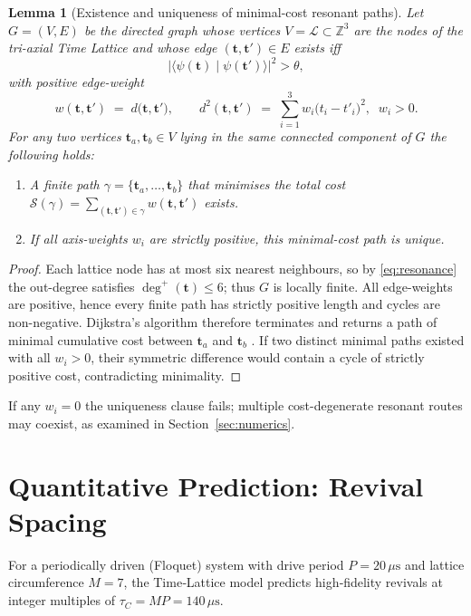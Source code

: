 \documentclass[11pt]{article}
\newtheorem{lemma}{Lemma}
\begin{document}
\begin{lemma}[Existence and uniqueness of minimal-cost resonant paths]\label{lem:minpath}
Let \(G=(V,E)\) be the directed graph whose vertices
\(V=\mathcal L\subset\mathbb Z^{3}\) are the nodes of the tri-axial Time Lattice and
whose edge \((\mathbf t,\mathbf t')\in E\) exists \emph{iff}
\begin{equation}
  \bigl|\langle\psi(\mathbf t)\mid\psi(\mathbf t')\rangle\bigr|^{2}>\theta,
  \label{eq:resonance}
\end{equation}
with positive edge-weight
\[
  w(\mathbf t,\mathbf t') \;=\; d\!\bigl(\mathbf t,\mathbf t'\bigr), 
  \qquad
  d^{2}(\mathbf t,\mathbf t')
  \;=\;
  \sum_{i=1}^{3} w_{i}\bigl(t_{i}-t'_{i}\bigr)^{2},
  \;\; w_{i}>0.
\]
For any two vertices \(\mathbf t_{a},\mathbf t_{b}\in V\) lying in the same
connected component of \(G\) the following holds:
\begin{enumerate}
  \item[(i)] A finite path \(\gamma=\{\mathbf t_{a},\dots,\mathbf t_{b}\}\) that
        minimises the total cost
        \(\mathcal S(\gamma)=\sum_{(\mathbf t,\mathbf t')\in\gamma}
        w(\mathbf t,\mathbf t')\) exists.
  \item[(ii)] If all axis-weights \(w_{i}\) are strictly positive, this
        minimal-cost path is unique.
\end{enumerate}
\end{lemma}

\begin{proof}
Each lattice node has at most six nearest neighbours, so by
\eqref{eq:resonance} the out-degree satisfies \(\deg^{+}(\mathbf t)\le 6\);
thus \(G\) is locally finite.  All edge-weights are positive, hence every
finite path has strictly positive length and cycles are non-negative.
Dijkstra’s algorithm therefore terminates and returns a path of minimal
cumulative cost between \(\mathbf t_{a}\) and \(\mathbf t_{b}\)
\cite{Dijkstra1959}.  If two distinct minimal paths existed with all
\(w_{i}>0\), their symmetric difference would contain a cycle of strictly
positive cost, contradicting minimality.
\end{proof}

If any \(w_{i}=0\) the uniqueness clause fails; multiple cost-degenerate
resonant routes may coexist, as examined in Section~\ref{sec:numerics}.


\section{Quantitative Prediction: Revival Spacing}\label{sec:comb}
For a periodically driven (Floquet) system with drive period $P = 20\,\mu\mathrm{s}$ and lattice circumference $M = 7$, the Time‑Lattice model predicts high‑fidelity revivals at integer multiples of $\tau_C = M P = 140\,\mu\mathrm{s}$.
\end{document}
